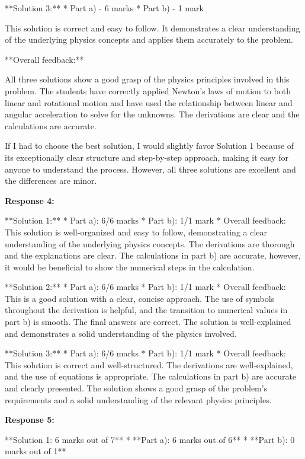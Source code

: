 \documentclass[a4paper,11pt]{article}
\begin{document}
**Solution 3:**
*   Part a) - 6 marks
*   Part b) - 1 mark

This solution is correct and easy to follow. It demonstrates a clear understanding of the underlying physics concepts and applies them accurately to the problem.

**Overall feedback:**

All three solutions show a good grasp of the physics principles involved in this problem. The students have correctly applied Newton's laws of motion to both linear and rotational motion and have used the relationship between linear and angular acceleration to solve for the unknowns. The derivations are clear and the calculations are accurate.

If I had to choose the best solution, I would slightly favor Solution 1 because of its exceptionally clear structure and step-by-step approach, making it easy for anyone to understand the process. However, all three solutions are excellent and the differences are minor.

\bigskip    
\textbf{Response 4:}

**Solution 1:**
*   Part a): 6/6 marks
*   Part b): 1/1 mark
*   Overall feedback: This solution is well-organized and easy to follow, demonstrating a clear understanding of the underlying physics concepts. The derivations are thorough and the explanations are clear. The calculations in part b) are accurate, however, it would be beneficial to show the numerical steps in the calculation.

**Solution 2:**
*   Part a): 6/6 marks
*   Part b): 1/1 mark
*   Overall feedback: This is a good solution with a clear, concise approach. The use of symbols throughout the derivation is helpful, and the transition to numerical values in part b) is smooth. The final answers are correct. The solution is well-explained and demonstrates a solid understanding of the physics involved.

**Solution 3:**
*   Part a): 6/6 marks
*   Part b): 1/1 mark
*   Overall feedback: This solution is correct and well-structured. The derivations are well-explained, and the use of equations is appropriate. The calculations in part b) are accurate and clearly presented. The solution shows a good grasp of the problem's requirements and a solid understanding of the relevant physics principles.

\bigskip    
\textbf{Response 5:}

**Solution 1: 6 marks out of 7**
* **Part a): 6 marks out of 6**
* **Part b): 0 marks out of 1**
\end{document}
